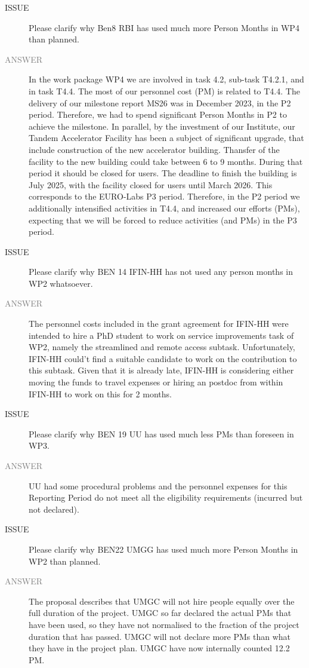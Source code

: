 \begin{prtwo}
\begin{description}
\item[ISSUE] Please clarify why Ben8 RBI has used much more Person Months in WP4 than planned.
\item[\textcolor{gray}{ANSWER}] In the work package WP4 we are involved in task 4.2, sub-task T4.2.1, and in task T4.4. The most of our personnel cost (PM) is related to T4.4. The delivery of our milestone report MS26 was in December 2023, in the P2 period. Therefore, we had to spend significant Person Months in P2 to achieve the milestone.  In parallel, by the investment of our Institute, our Tandem Accelerator Facility has been a subject of significant upgrade, that include construction of the new accelerator building. Thansfer of the facility to the new building could take between 6 to 9 months. During that period  it should be closed for users. The deadline to finish the building is July 2025, with the facility closed for users until March 2026. This corresponds to the EURO-Labs P3 period. Therefore, in the P2 period we additionally intensified activities in T4.4, and increased our efforts (PMs), expecting that we will be forced to reduce activities (and PMs) in the P3 period.

\item[ISSUE] Please clarify why BEN 14 IFIN-HH has not used any person months in WP2 whatsoever. 
\item[\textcolor{gray}{ANSWER}] The personnel costs included in the grant agreement for IFIN-HH were intended to hire a PhD student to work on service improvements task of WP2, namely the streamlined and remote access subtask. Unfortunately, IFIN-HH could’t find a suitable candidate to work on the contribution to this subtask. Given that it is already late, IFIN-HH is considering either moving the funds to travel expenses or hiring an postdoc from within IFIN-HH to work on this for 2 months.

\item[ISSUE] Please clarify why BEN 19 UU has used much less PMs than foreseen in WP3.
\item[\textcolor{gray}{ANSWER}] UU had some procedural problems and the personnel expenses for this Reporting Period do not meet all the eligibility requirements (incurred but not declared).

\item[ISSUE] Please clarify why BEN22 UMGG has used much more Person Months in WP2 than planned.  
\item[\textcolor{gray}{ANSWER}]  The proposal describes that UMGC will not hire people equally over the full duration of the project. UMGC so far declared the actual PMs that have been used, so they have not normalised to the fraction of the project duration that has passed. UMGC will not declare more PMs than what they have in the project plan. UMGC have now internally counted 12.2 PM.
\end{description}
\end{prtwo}

